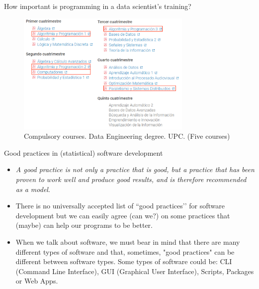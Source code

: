\documentclass[ignorenonframetext,]{beamer}
\providecommand{\tightlist}{%
  \setlength{\itemsep}{0pt}\setlength{\parskip}{0pt}}
\begin{document}
\begin{frame}{%
\protect\hypertarget{how-important-is-programming-in-a-data-scientists-training}{%
How important is programming in a data scientist’s training?}}

\begin{figure}
\includegraphics[width=0.75\textwidth]{"images/coursesDataEngineeringUPC"}
\caption{Compulsory courses. Data Engineering degree. UPC. (Five courses)}
\end{figure}

\end{frame}

\begin{frame}{%
\protect\hypertarget{good-practices-in-statistical-software-development}{%
Good practices in (statistical) software development}}

\begin{itemize}
\tightlist
\item
  \emph{A good practice is not only a practice that is good, but a
  practice that has been proven to work well and produce good results,
  and is therefore recommended as a model}.
\item
  There is no universally accepted list of ``good practices’’ for
  software development but we can easily agree (can we?) on some
  practices that (maybe) can help our programs to be better.
\item
 When we talk about software, we must bear in mind that there are many different types of software and that, sometimes, "good practices" can be different between software types. Some types of software could be: CLI (Command Line Interface), GUI (Graphical User Interface), Scripts, Packages or Web Apps.
 
\end{itemize}

\end{frame}
\end{document}
